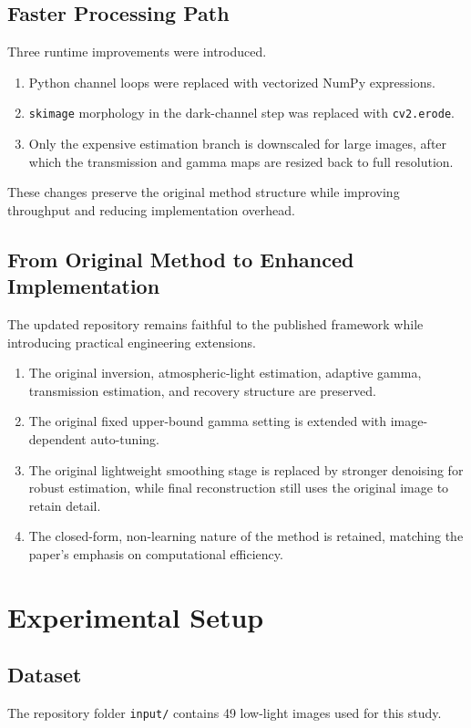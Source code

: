 \documentclass[conference]{IEEEtran}
\begin{document}
\subsection{Faster Processing Path}
Three runtime improvements were introduced.

\begin{enumerate}
\item Python channel loops were replaced with vectorized NumPy expressions.
\item \texttt{skimage} morphology in the dark-channel step was replaced with \texttt{cv2.erode}.
\item Only the expensive estimation branch is downscaled for large images, after which the transmission and gamma maps are resized back to full resolution.
\end{enumerate}

These changes preserve the original method structure while improving throughput and reducing implementation overhead.

\subsection{From Original Method to Enhanced Implementation}
The updated repository remains faithful to the published framework while introducing practical engineering extensions.

\begin{enumerate}
\item The original inversion, atmospheric-light estimation, adaptive gamma, transmission estimation, and recovery structure are preserved.
\item The original fixed upper-bound gamma setting is extended with image-dependent auto-tuning.
\item The original lightweight smoothing stage is replaced by stronger denoising for robust estimation, while final reconstruction still uses the original image to retain detail.
\item The closed-form, non-learning nature of the method is retained, matching the paper's emphasis on computational efficiency.
\end{enumerate}

\section{Experimental Setup}
\subsection{Dataset}
The repository folder \texttt{input/} contains 49 low-light images used for this study.
\end{document}
